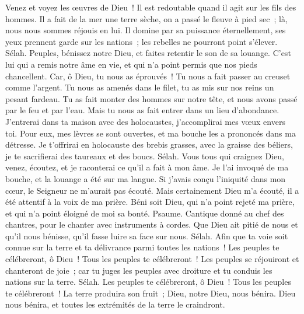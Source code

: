 \begin{multicols}{2}
Venez et voyez les œuvres de Dieu~! Il est redoutable quand il agit sur les fils des hommes.
Il a fait de la mer une terre sèche, on a passé le fleuve à pied sec~; là, nous nous sommes réjouis en lui.
Il domine par sa puissance éternellement, ses yeux prennent garde sur les nations~; les rebelles ne pourront point s'élever. Sélah.
Peuples, bénissez notre Dieu, et faites retentir le son de sa louange.
C'est lui qui a remis notre âme en vie, et qui n'a point permis que nos pieds chancellent.
Car, ô Dieu, tu nous as éprouvés~! Tu nous a fait passer au creuset comme l'argent.
Tu nous as amenés dans le filet, tu as mis sur nos reins un pesant fardeau.
Tu as fait monter des hommes sur notre tête, et nous avons passé par le feu et par l'eau. Mais tu nous as fait entrer dans un lieu d'abondance.
J'entrerai dans ta maison avec des holocaustes, j'accomplirai mes vœux envers toi.
Pour eux, mes lèvres se sont ouvertes, et ma bouche les a prononcés dans ma détresse.
Je t'offrirai en holocauste des brebis grasses, avec la graisse des béliers, je te sacrifierai des taureaux et des boucs. Sélah.
Vous tous qui craignez Dieu, venez, écoutez, et je raconterai ce qu'il a fait à mon âme.
Je l'ai invoqué de ma bouche, et la louange a été sur ma langue.
Si j'avais conçu l'iniquité dans mon cœur, le Seigneur ne m'aurait pas écouté.
Mais certainement Dieu m'a écouté, il a été attentif à la voix de ma prière.
Béni soit Dieu, qui n'a point rejeté ma prière, et qui n'a point éloigné de moi sa bonté.
\VerseOne{}Psaume. Cantique donné au chef des chantres, pour le chanter avec instruments à cordes.
Que Dieu ait pitié de nous et qu'il nous bénisse, qu'il fasse luire sa face sur nous. Sélah.
Afin que ta voie soit connue sur la terre et ta délivrance parmi toutes les nations~!
Les peuples te célébreront, ô Dieu~! Tous les peuples te célébreront~!
Les peuples se réjouiront et chanteront de joie~; car tu juges les peuples avec droiture et tu conduis les nations sur la terre. Sélah.
Les peuples te célébreront, ô Dieu~! Tous les peuples te célébreront~!
La terre produira son fruit~; Dieu, notre Dieu, nous bénira.
Dieu nous bénira, et toutes les extrémités de la terre le craindront.

\end{multicols}
